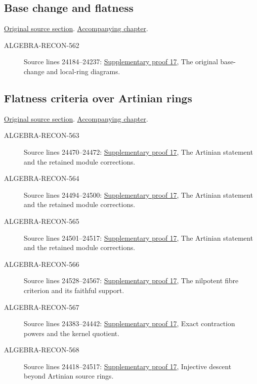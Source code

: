 \subsection{Base change and flatness}
\hypertarget{algebra-source-section-base-change-flat}{}
\noindent\href{https://github.com/stacks/stacks-project/blob/a04446e57ec1fbc252a871afcec7752fb2807b14/algebra.tex\#L24177}{Original source section}. \href{algebra.pdf\#nameddest=section-base-change-flat}{Accompanying chapter}.

\begin{description}
\item[ALGEBRA-RECON-562] Source lines 24184--24237: \hyperlink{algebra_nilpotent_flatness_notes_20260928}{Supplementary proof 17}, The original base-change and local-ring diagrams.
\end{description}

\subsection{Flatness criteria over Artinian rings}
\hypertarget{algebra-source-section-flatness-artinian}{}
\noindent\href{https://github.com/stacks/stacks-project/blob/a04446e57ec1fbc252a871afcec7752fb2807b14/algebra.tex\#L24286}{Original source section}. \href{algebra.pdf\#nameddest=section-flatness-artinian}{Accompanying chapter}.

\begin{description}
\item[ALGEBRA-RECON-563] Source lines 24470--24472: \hyperlink{algebra_nilpotent_flatness_notes_20260928}{Supplementary proof 17}, The Artinian statement and the retained module corrections.
\item[ALGEBRA-RECON-564] Source lines 24494--24500: \hyperlink{algebra_nilpotent_flatness_notes_20260928}{Supplementary proof 17}, The Artinian statement and the retained module corrections.
\item[ALGEBRA-RECON-565] Source lines 24501--24517: \hyperlink{algebra_nilpotent_flatness_notes_20260928}{Supplementary proof 17}, The Artinian statement and the retained module corrections.
\item[ALGEBRA-RECON-566] Source lines 24528--24567: \hyperlink{algebra_nilpotent_flatness_notes_20260928}{Supplementary proof 17}, The nilpotent fibre criterion and its faithful support.
\item[ALGEBRA-RECON-567] Source lines 24383--24442: \hyperlink{algebra_nilpotent_flatness_notes_20260928}{Supplementary proof 17}, Exact contraction powers and the kernel quotient.
\item[ALGEBRA-RECON-568] Source lines 24418--24517: \hyperlink{algebra_nilpotent_flatness_notes_20260928}{Supplementary proof 17}, Injective descent beyond Artinian source rings.
\end{description}

